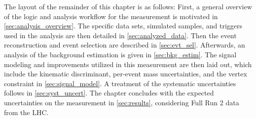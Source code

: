 The layout of the remainder of this chapter is as follows:
First, a general overview of the logic and analysis workflow for the \mH measurement is motivated in \cref{sec:analysis_overview}.
The specific data sets, simulated samples, and triggers used in the analysis are then detailed in \cref{sec:analyzed_data}.
Then the event reconstruction and event selection are described in \cref{sec:evt_sel}.
Afterwards, an analysis of the background estimation is given in \cref{sec:bkg_estim}.
The signal modeling and improvements utilized in this measurement are then laid out, which include the kinematic discriminant, per-event mass uncertainties, and the vertex constraint in \cref{sec:signal_model}.
A treatment of the systematic uncertainties follows in \cref{sec:syst_uncert}.
The chapter concludes with the expected uncertainties on the \mH measurement in \cref{sec:results}, considering Full Run 2 data from the LHC.

